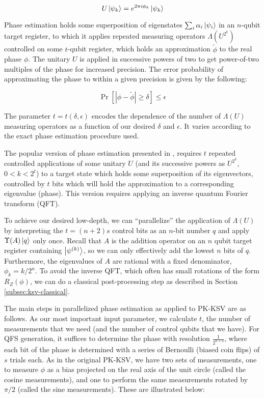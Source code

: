 \begin{displaymath}
U\left\vert{\psi_k}\right\rangle = e^{2\pi i \phi_k} \left\vert{\psi_k}\right\rangle
\end{displaymath}

Phase estimation holds some superposition of eigenstates
$\sum_{i} \alpha_i \left\vert{\psi_i}\right\rangle$
in an $n$-qubit target register, to which it applies repeated measuring
operators $\Lambda(U^{2^k})$
controlled on some $t$-qubit register, which holds an
approximation $\tilde{\phi}$ to the real phase $\phi$.
The unitary $U$ is applied in successive powers of two to get
power-of-two multiples of the phase for increased precision.
The error probability of approximating the phase to within a given
precision is given by the following:

\begin{displaymath}
\Pr\left[ | \phi - \tilde{\phi} | \ge \delta \right] \le \epsilon
\end{displaymath}

The parameter $t = t(\delta, \epsilon)$ encodes the dependence of the number
of $\Lambda(U)$ measuring operators as a function of our desired
$\delta$ and $\epsilon$.
It varies according to the exact phase estimation procedure
used.

The popular version of phase estimation presented in \cite{Nielsen2000},
requires $t$ repeated controlled applications of some unitary
$U$ (and its successive powers as $U^{2^k}$, $0<k<2^t$)
to a target state which holds some superposition of its eigenvectors,
controlled by $t$ bits which will hold the approximation to a corresponding
eigenvalue (phase).
This version requires applying an inverse quantum Fourier
transform (QFT).

To achieve our desired low-depth, we can ``parallelize'' the application of
$\Lambda(U)$ by interpreting the
$t = (n+2)s$ control bits as an $n$-bit number $q$ and
apply $\Upsilon(A)\left\vert{q}\right\rangle$ only once.
Recall that $A$ is the addition operator on an $n$ qubit
target register containing $\left\vert{\psi^{(k)}}\right\rangle$, so we can
only effectively add the lowest $n$ bits of $q$.
Furthermore, the eigenvalues of $A$ are rational with a fixed
denominator, $\phi_k = k / 2^n$.
To avoid the inverse QFT, which often has small rotations of the form 
$R_Z(\phi)$, 
we can do a classical post-processing step as described in Section \ref{subsec:ksv-classical}.

The main steps in parallelized phase estimation as applied to PK-KSV
are as follows. As our most important input parameter, we calculate $t$, the number
of measurements that we need (and the number of control qubits that we have).
For QFS generation, it suffices to determine the phase with resolution $\frac{1}{2^{n+2}}$,
where each bit of the phase is determined with a series of Bernoulli (biased coin flips)
of $s$ trials each. As in the original PK-KSV, we have two sets of measurements,
one to measure $\phi$ as a bias projected on the real axis of the unit circle (called
the cosine measurements), and one to perform the same measurements rotated by $\pi/2$
(called the sine measurements). These are illustrated below:

